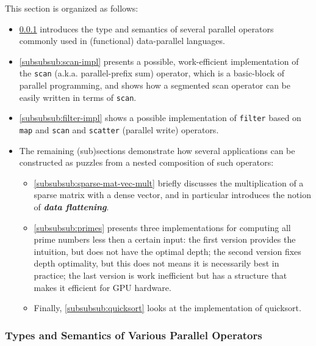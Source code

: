 \documentclass[acmsmall,review]{acmart}\settopmatter{printfolios=true,printccs=false,printacmref=false}
\begin{document}
This section is organized as follows: 
\begin{itemize}
    \item \cref{subsubsub:var-par-ops} introduces
the type and semantics of several parallel operators commonly used in 
(functional) data-parallel languages. 
    \item \cref{subsubsub:scan-impl} presents
a possible, work-efficient implementation of the \lstinline{scan} 
(a.k.a. parallel-prefix sum) operator, which is a basic-block of
parallel programming, and shows how a segmented scan operator can
be easily written in terms of \lstinline{scan}. 

    \item \cref{subsubsub:filter-impl} shows a possible implementation of
\lstinline{filter} based on \lstinline{map} and \lstinline{scan}
and \lstinline{scatter} (parallel write) operators.

    \item The remaining (sub)sections demonstrate how 
        several applications can be constructed as puzzles from a nested
        composition of such operators:
        \begin{itemize}
        \item \cref{subsubsub:sparse-mat-vec-mult} briefly discusses
            the multiplication of a sparse matrix with a dense vector,
            and in particular introduces the notion of 
            \emph{\bf data flattening}.
        \item \cref{subsubsub:primes} presents three implementations for
            computing all prime numbers less then a certain input: 
            the first version provides the intuition, but does not have 
            the optimal depth; the second version fixes depth optimality,
            but this does not means it is necessarily best in practice;
            the last version is work inefficient but has a structure
            that makes it efficient for GPU hardware.
        \item Finally, \cref{subsubsub:quicksort} looks at the implementation
            of quicksort.
        \end{itemize}
\end{itemize}


\subsubsection{Types and Semantics of Various Parallel Operators}
\label{subsubsub:var-par-ops}
$\mbox{ }$\\
\end{document}
